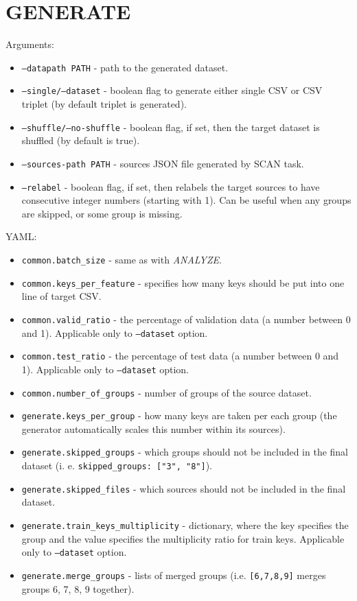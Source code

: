 \section{GENERATE}

\noindent
Arguments:

\begin{itemize}

\item \texttt{--datapath PATH} - path to the generated dataset.
\item \texttt{--single/--dataset} - boolean flag to generate either single CSV or CSV triplet (by default triplet is generated).
\item \texttt{--shuffle/--no-shuffle} - boolean flag, if set, then the target dataset is shuffled (by default is true).
\item \texttt{--sources-path PATH} - sources JSON file generated by SCAN task.
\item \texttt{--relabel} - boolean flag, if set, then relabels the target sources to have consecutive integer numbers (starting with 1).  Can be useful when any groups are skipped, or some group is missing.

\end{itemize}

\noindent
YAML:

\begin{itemize}

\item \texttt{common.batch\_size} - same as with \textit{ANALYZE}.
\item \texttt{common.keys\_per\_feature} -  specifies how many keys should be put into one line of target CSV.
\item \texttt{common.valid\_ratio} - the percentage of validation data (a number between 0 and 1). Applicable only to \texttt{--dataset} option.
\item \texttt{common.test\_ratio} - the percentage of test data (a number between 0 and 1). Applicable only to \texttt{--dataset} option.
\item \texttt{common.number\_of\_groups} - number of groups of the source dataset.
\item \texttt{generate.keys\_per\_group} - how many keys are taken per each group (the generator automatically scales this number within its sources).
\item \texttt{generate.skipped\_groups} - which groups should not be included in the final dataset (i. e. \texttt{skipped\_groups: ["3", "8"]}).
\item \texttt{generate.skipped\_files} - which sources should not be included in the final dataset.
\item \texttt{generate.train\_keys\_multiplicity} - dictionary, where the key specifies the group and the value specifies the multiplicity ratio for train keys. Applicable only to \texttt{--dataset} option.
\item \texttt{generate.merge\_groups} - lists of merged groups (i.e. \texttt{[6,7,8,9]}  merges groups 6, 7, 8, 9 together).

\end{itemize}

